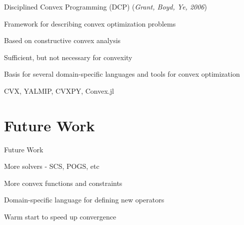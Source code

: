 \documentclass{beamer}
\begin{document}

\begin{frame}{Disciplined Convex Programming (DCP)}
	(\emph{Grant, Boyd, Ye, 2006})
	
	\vfill
	\BIT
		\item Framework for describing convex optimization problems
		\item Based on constructive convex analysis
		\item Sufficient, but not necessary for convexity
		\item Basis for several domain-specific languages and tools for convex optimization
		\BIT
			\item CVX, YALMIP, CVXPY, Convex.jl
		\EIT
	\EIT
	\vfill
\end{frame}

\section{Future Work}
\begin{frame}{Future Work}
	\BIT
		\item More solvers - SCS, POGS, etc
		\item More convex functions and constraints
		\item Domain-specific language for defining new operators
		\item Warm start to speed up convergence
	\EIT
\end{frame}
\end{document}
